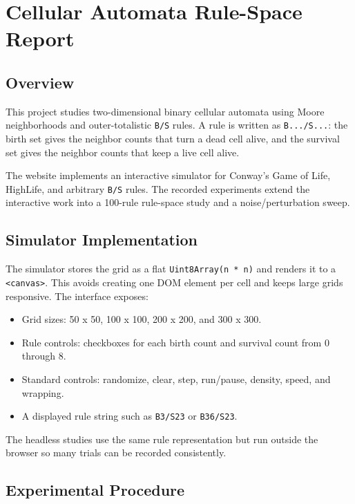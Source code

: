 \documentclass[
]{article}
\author{}
\date{\vspace{-2.5em}}
\providecommand{\tightlist}{%
  \setlength{\itemsep}{0pt}\setlength{\parskip}{0pt}}
\begin{document}
\section{Cellular Automata Rule-Space
Report}\label{cellular-automata-rule-space-report}

\subsection{Overview}\label{overview}

This project studies two-dimensional binary cellular automata using
Moore neighborhoods and outer-totalistic \texttt{B/S} rules. A rule is
written as \texttt{B.../S...}: the birth set gives the neighbor counts
that turn a dead cell alive, and the survival set gives the neighbor
counts that keep a live cell alive.

The website implements an interactive simulator for Conway's Game of
Life, HighLife, and arbitrary \texttt{B/S} rules. The recorded
experiments extend the interactive work into a 100-rule rule-space study
and a noise/perturbation sweep.

\subsection{Simulator Implementation}\label{simulator-implementation}

The simulator stores the grid as a flat \texttt{Uint8Array(n\ *\ n)} and
renders it to a \texttt{\textless{}canvas\textgreater{}}. This avoids
creating one DOM element per cell and keeps large grids responsive. The
interface exposes:

\begin{itemize}
\tightlist
\item
  Grid sizes: 50 x 50, 100 x 100, 200 x 200, and 300 x 300.
\item
  Rule controls: checkboxes for each birth count and survival count from
  0 through 8.
\item
  Standard controls: randomize, clear, step, run/pause, density, speed,
  and wrapping.
\item
  A displayed rule string such as \texttt{B3/S23} or \texttt{B36/S23}.
\end{itemize}

The headless studies use the same rule representation but run outside
the browser so many trials can be recorded consistently.

\subsection{Experimental Procedure}\label{experimental-procedure}
\end{document}
